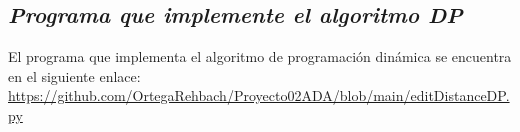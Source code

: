 \subsection{\textit{\textbf{Programa que implemente el algoritmo DP}}}

El programa que implementa el algoritmo de programación dinámica se encuentra en el siguiente enlace: \url{https://github.com/OrtegaRehbach/Proyecto02ADA/blob/main/editDistanceDP.py}
